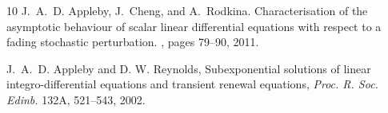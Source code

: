 \documentclass[a4paper,10pt,reqno]{amsart}
\numberwithin{equation}{section}
\theoremstyle{definition}
\theoremstyle{remark}
\DeclareMathOperator{\1}{\mathbbm 1}
\begin{document}
\begin{thebibliography}{10}
		J.~A.~D. Appleby, J.~Cheng, and A.~Rodkina.
		\newblock Characterisation of the asymptotic behaviour of scalar linear differential equations with respect to a fading stochastic perturbation.
		, pages 79--90, 2011.
		
		
		
		J.~A.~D. Appleby and D. W. Reynolds, Subexponential solutions of linear
		integro-differential equations and transient renewal equations,
		{\em Proc. R. Soc. Edinb.} 132A, 521--543, 2002.		
		

\end{thebibliography}
\end{document}
